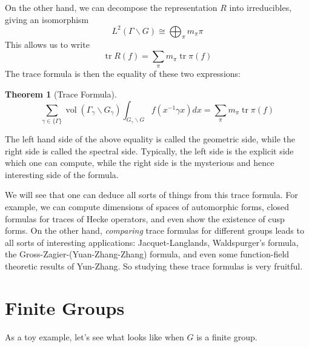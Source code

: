\documentclass[leqno,12pt,a4paper, openany]{amsbook}
\newtheorem{thm}{Theorem}[chapter]
\theoremstyle{definition}
\numberwithin{equation}{section}
\DeclareMathOperator{\tr}{tr}
\DeclareMathOperator{\vol}{vol}
\begin{document}
On the other hand, we can decompose the representation $R$ into irreducibles, giving an isomorphism 
\[ L^2(\Gamma \backslash G) \cong \bigoplus_{\pi} m_\pi \pi \] This allows us to write \[ \tr R(f) = \sum_\pi m_\pi \tr \pi(f)\] The trace formula is then the equality of these two expressions:
\begin{thm}[Trace Formula]\label{traceformula}
    \[ \sum_{\gamma \in \{ \Gamma\}} \vol (\Gamma_\gamma \backslash G_\gamma) \int_{G_\gamma \backslash G} f(x^{-1} \gamma x) dx = \sum_\pi m_\pi \tr \pi(f) \] 
\end{thm}

The left hand side of the above equality is called the geometric side, while the right side is called the spectral side. Typically, the left side is the explicit side which one can compute, while the right side is the mysterious and hence interesting side of the formula. 

We will see that one can deduce all sorts of things from this trace formula. For example, we can compute dimensions of spaces of automorphic forms, closed formulas for traces of Hecke operators, and even show the existence of cusp forms. On the other hand, \emph{comparing} trace formulas for different groups leads to all sorts of interesting applications: Jacquet-Langlands, Waldspurger's formula, the Gross-Zagier-(Yuan-Zhang-Zhang)
formula, and even some function-field theoretic results of Yun-Zhang. So studying these trace formulas is very fruitful.

\section{Finite Groups}

As a toy example, let's see what  looks like when $G$ is a finite group. 
\end{document}
